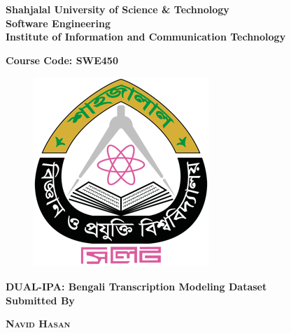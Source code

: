     \begin{titlepage}
       \begin{center}

          \textbf{\fontsize{19}{50} \selectfont Shahjalal University of Science \& Technology}\\
          \vspace{5mm}
        \Large
        \textbf{Software Engineering}\\
        \textbf{Institute of Information and Communication Technology}\\
        \vspace{0.3cm}

        \large
        \textbf{Course Code: SWE450}\\
        \vspace{0.3cm}
        
        \begin{figure}[h!]
            \centering
            \includegraphics[scale=1.5]{Images/Logo/Shahjalal_University_of_Science_and_Technology_logo.png}
            \label{fig:sust_logo}
        \end{figure}
        \vspace{0.3cm}
        
        \Large
        \textbf{DUAL-IPA: Bengali Transcription Modeling Dataset}\\
        
        \vspace{0.3cm}
        {\bf Submitted By}
        \begin{multicols}{2}
           \textsc{\Large \bf Navid Hasan }\\
                \\ 
                \\
                \\
           

\end{multicols}
\end{center}
\end{titlepage}
